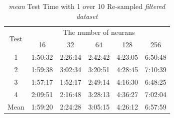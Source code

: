 \documentclass[draft,dvipsnames]{drexel-thesis}
\begin{document}
\begin{thesis}
\begin{table}[!t]
\centering
\caption{{\em mean} Test Time with 1 over 10 Re-sampled {\em filtered dataset}}
\label{tbl:mean_1_10_time}
\begin{tabular}{|c|c|c|c|c|c|}
\hline
\multirow{2}{*}{Test}      & \multicolumn{5}{c|}{The number of neurans}                                                                                                               \\ \cline{2-6} 
                           & 16                           & 32                           & 64                           & 128                          & 256                          \\ \hline
1                          & 1:50:32                      & 2:26:14                      & 2:42:42                      & 4:23:05                      & 6:50:48                      \\ \hline
2                          & 1:59:38                      & 3:02:34                      & 3:20:51                      & 4:28:45                      & 7:10:39                      \\ \hline
3                          & 1:57:17                      & 1:52:17                      & 2:49:14                      & 4:16:30                      & 6:48:25                      \\ \hline
4                          & 2:09:51                      & 2:16:48                      & 3:28:13                      & 4:36:27                      & 7:02:04                      \\ \hline
\multicolumn{1}{|l|}{Mean} & \multicolumn{1}{l|}{1:59:20} & \multicolumn{1}{l|}{2:24:28} & \multicolumn{1}{l|}{3:05:15} & \multicolumn{1}{l|}{4:26:12} & \multicolumn{1}{l|}{6:57:59} \\ \hline
\end{tabular}
\end{table}


\end{thesis}
\end{document}
